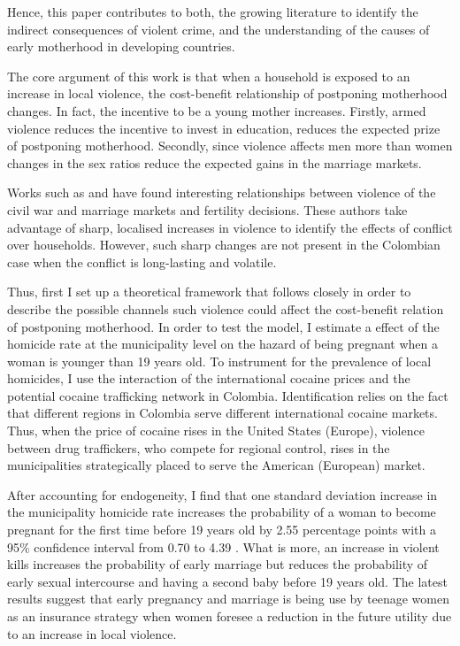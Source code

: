 \documentclass[a4paper,10pt,twocolumn,preprint,3p,authoryear]{elsarticle}
\begin{document}
Hence, this paper contributes to both, the growing literature to identify the indirect consequences of violent crime, and the understanding of the causes of early motherhood in developing countries. 

The core argument of this work is that when a household is exposed to an increase in local violence, the cost-benefit relationship of postponing motherhood changes. In fact, the incentive to be a young mother increases. Firstly, armed violence reduces the incentive to invest in education, reduces the expected prize of postponing motherhood. Secondly, since violence affects men more than women changes in the sex ratios reduce the expected gains in the marriage markets. 

Works such as \citet{AbramitzkyDelavandeVasconcelos2010} and \citet{Shemyakina2009} have found interesting relationships between violence of the civil war and marriage markets and fertility decisions. These authors take advantage of sharp, localised increases in violence to identify the effects of conflict over households. However, such sharp changes are not present in the Colombian case when the conflict is long-lasting and volatile.

Thus, first I set up a theoretical framework that follows closely \cite{KearneyLevine2011} in order to describe the possible channels such violence could affect the cost-benefit relation of postponing motherhood. In order to test the model, I estimate a effect of the homicide rate at the municipality level on the hazard of being pregnant when a woman is younger than 19 years old. To instrument for the prevalence of local homicides, I use the interaction of the international cocaine prices and the potential cocaine trafficking network in Colombia. Identification relies on the fact that different regions in Colombia serve different international cocaine markets. Thus, when the price of cocaine rises in the United States (Europe), violence between drug traffickers, who compete for regional control, rises in the municipalities strategically placed to serve the American (European) market.  

After accounting for endogeneity, I find that one standard deviation increase in the municipality homicide rate increases the probability of a woman to become pregnant for the first time before 19 years old by 2.55 percentage points with a 95\% confidence interval from 0.70 to 4.39 . What is more, an increase in violent kills increases the probability of early marriage but reduces the probability of early sexual intercourse and having a second baby before 19 years old. The latest results suggest that early pregnancy and marriage is being use by teenage women as an insurance strategy when women foresee a reduction in the future utility due to an increase in local violence.
\end{document}
